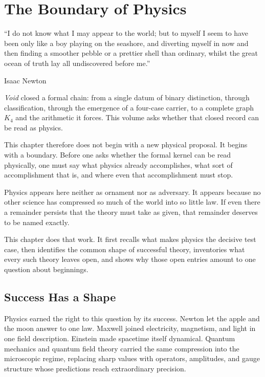 \documentclass[11pt,a4paper]{book}
\begin{document}
\chapter{The Boundary of Physics}
\label{ch:boundary-of-physics}

\epigraph{``I do not know what I may appear to the world; but to myself I seem to have been only like a boy playing on the seashore, and diverting myself in now and then finding a smoother pebble or a prettier shell than ordinary, whilst the great ocean of truth lay all undiscovered before me.''}{Isaac Newton}

\textit{Void} closed a formal chain: from a single datum of binary distinction, through classification, through the emergence of a four-case carrier, to a complete graph $K_4$ and the arithmetic it forces.  This volume asks whether that closed record can be read as physics.

This chapter therefore does not begin with a new physical proposal.  It begins with a boundary.  Before one asks whether the formal kernel can be read physically, one must say what physics already accomplishes, what sort of accomplishment that is, and where even that accomplishment must stop.

Physics appears here neither as ornament nor as adversary.  It appears because no other science has compressed so much of the world into so little law.  If even there a remainder persists that the theory must take as given, that remainder deserves to be named exactly.

This chapter does that work.  It first recalls what makes physics the decisive test case, then identifies the common shape of successful theory, inventories what every such theory leaves open, and shows why those open entries amount to one question about beginnings.

\section*{Success Has a Shape}

Physics earned the right to this question by its success.  Newton let the apple and the moon answer to one law.  Maxwell joined electricity, magnetism, and light in one field description.  Einstein made spacetime itself dynamical.  Quantum mechanics and quantum field theory carried the same compression into the microscopic regime, replacing sharp values with operators, amplitudes, and gauge structure whose predictions reach extraordinary precision.
\end{document}
